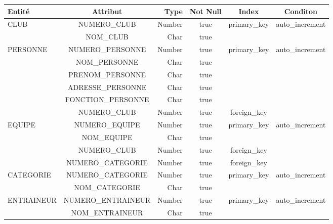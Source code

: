   
\begin{center}
\begin{tabular}{|l|c|r|c|c|c|} 
   \hline
    Entité & Attribut & Type & Not Null & Index & Conditon  \\
    \hline
    \hline
    CLUB & NUMERO\_CLUB & Number & true & primary\_key & auto\_increment  \\
    \cline{2-6} 
        & NOM\_CLUB & Char& true & &  \\
    \hline
    \hline
    PERSONNE & NUMERO\_PERSONNE & Number & true & primary\_key & auto\_increment \\
    \cline{2-6}
    & NOM\_PERSONNE & Char & true & & \\
    \cline{2-6}
    & PRENOM\_PERSONNE & Char & true & &\\
    \cline{2-6}
    & ADRESSE\_PERSONNE & Char & true & & \\
    \cline{2-6}
    & FONCTION\_PERSONNE & Char & true & & \\
    \cline{2-6}
    & NUMERO\_CLUB & Number & true & foreign\_key & \\
    \hline
    \hline
    EQUIPE & NUMERO\_EQUIPE & Number & true & primary\_key & auto\_increment \\
    \cline{2-6}
    & NOM\_EQUIPE & Char & true & & \\
    \cline{2-6}
    & NUMERO\_CLUB & Number & true & foreign\_key &\\
    \cline{2-6}\cline{2-6}
    & NUMERO\_CATEGORIE & Number & true & foreign\_key & \\
    \hline
    \hline
    CATEGORIE & NUMERO\_CATEGORIE & Number & true & primary\_key & auto\_increment \\
    \cline{2-6}
    &NOM\_CATEGORIE & Char & true & & \\
    \hline
    \hline
    ENTRAINEUR & NUMERO\_ENTRAINEUR & Number & true & primary\_key & auto\_increment\\
    \cline{2-6}
    & NOM\_ENTRAINEUR & Char & true &  & \\

\end{tabular}
\end{center}
